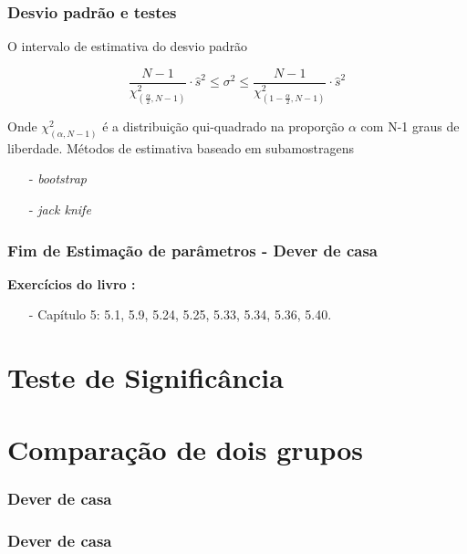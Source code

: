 \documentclass[graphics,14pt]{beamer}
\begin{document}
\begin{frame}[t,fragile=singleslide]
\frametitle{Desvio padrão e testes }
	O intervalo de estimativa do desvio padrão 
	
	\begin{equation*}
	\frac{N-1}{\chi^2_{(\frac{\alpha}{2},N-1)}} \cdot \hat{s}^2 \leq \sigma^2 \leq \frac{N-1}{ \chi^2_{(1- \frac{\alpha}{2},N-1)}} \cdot \hat{s}^2
	\end{equation*}
	
	Onde $\chi^2_{(\alpha,N-1)}$ é a distribuição qui-quadrado na proporção $\alpha$ com N-1 graus de liberdade.
	\vspace{2cm}	
	Métodos de estimativa baseado em subamostragens
	\begin{itemize}
		\item[-] \textit{bootstrap}
		\item[-] \textit{jack knife}
	\end{itemize}
\end{frame}
\begin{frame}[t,fragile=singleslide]
\frametitle{Fim de Estimação de parâmetros - Dever de casa}
\textbf{Exercícios do livro \cite{Agresti2018}:}
\begin{itemize}
	\item[-] Capítulo 5: 5.1, 5.9, 5.24, 5.25, 5.33, 5.34, 5.36, 5.40.
\end{itemize}
\end{frame}
\section[Teste de Significância]{Teste de Significância}
\section{Comparação de dois grupos}
\begin{frame}[t,fragile=singleslide]
\frametitle{Dever de casa}
\end{frame}

\begin{frame}[t,fragile=singleslide]
\frametitle{Dever de casa}
\end{frame}
\end{document}
